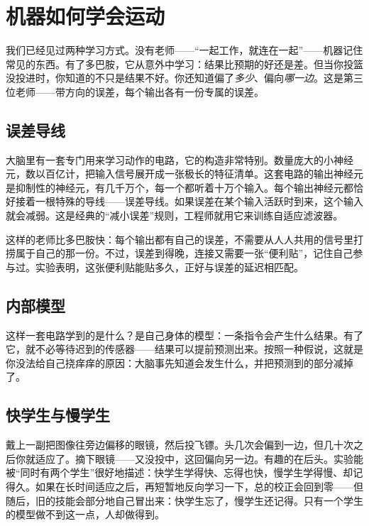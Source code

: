\chapter{机器如何学会运动}

我们已经见过两种学习方式。没有老师——“一起工作，就连在一起”——机器记住常见的东西。有了多巴胺，它从意外中学习：结果比预期的好还是差。但当你投篮没投进时，你知道的不只是结果不好。你还知道偏了\emph{多少}、偏向\emph{哪一边}。这是第三位老师——带方向的误差，每个输出各有一份专属的误差。

\section*{误差导线}

大脑里有一套专门用来学习动作的电路，它的构造非常特别。数量庞大的小神经元，数以百亿计，把输入信号展开成一张极长的特征清单。这套电路的输出神经元是抑制性的神经元，有几千万个，每一个都听着十万个输入。每个输出神经元都恰好接着一根特殊的导线——误差导线。如果误差在某个输入活跃时到来，这个输入就会减弱。这是经典的“减小误差”规则，工程师就用它来训练自适应滤波器。


这样的老师比多巴胺快：每个输出都有自己的误差，不需要从人人共用的信号里打捞属于自己的那一份。不过，误差到得晚，连接又需要一张“便利贴”，记住自己参与过。实验表明，这张便利贴能贴多久，正好与误差的延迟相匹配。

\section*{内部模型}

这样一套电路学到的是什么？是自己身体的模型：一条指令会产生什么结果。有了它，就不必等待迟到的传感器——结果可以提前预测出来。按照一种假说，这就是你没法给自己挠痒痒的原因：大脑事先知道会发生什么，并把预测到的部分减掉了。

\section*{快学生与慢学生}

戴上一副把图像往旁边偏移的眼镜，然后投飞镖。头几次会偏到一边，但几十次之后你就适应了。摘下眼镜——又没投中，这回偏向另一边。有趣的在后头。实验能被“同时有两个学生”很好地描述：快学生学得快、忘得也快，慢学生学得慢、却记得久。如果在长时间适应之后，再短暂地反向学习一下，总的校正会回到零——但随后，旧的技能会部分地自己冒出来：快学生忘了，慢学生还记得。只有一个学生的模型做不到这一点，人却做得到。

